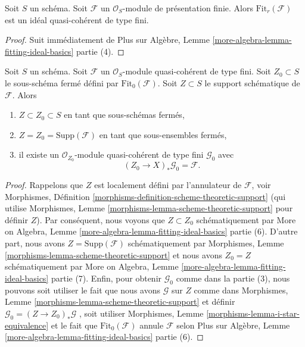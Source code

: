 \begin{lemma}
\label{lemma-fitting-ideal-of-finitely-presented}
Soit  $S$  un schéma. Soit  $\mathcal{F}$  un  $\mathcal{O}_S$-module de
présentation finie. Alors  $\text{Fit}_r(\mathcal{F})$  est un idéal quasi-cohérent de type fini.
\end{lemma}

\begin{proof}
Suit immédiatement de Plus sur Algèbre, Lemme  \ref{more-algebra-lemma-fitting-ideal-basics}  partie (4).
\end{proof}

\begin{lemma}
\label{lemma-on-subscheme-cut-out-by-Fit-0}
Soit  $S$  un schéma. Soit  $\mathcal{F}$  un  $\mathcal{O}_S$-module
quasi-cohérent de type fini. Soit  $Z_0 \subset S$  le sous-schéma fermé défini par
 $\text{Fit}_0(\mathcal{F})$. Soit  $Z \subset S$  le support schématique de  $\mathcal{F}$. Alors
\begin{enumerate}
\item $Z \subset Z_0 \subset S$  en tant que sous-schémas fermés,
\item $Z = Z_0 = \text{Supp}(\mathcal{F})$  en tant que sous-ensembles fermés,
\item il existe un  $\mathcal{O}_{Z_0}$-module quasi-cohérent de type fini  $\mathcal{G}_0$  avec
$$
(Z_0 \to X)_*\mathcal{G}_0 = \mathcal{F}.
$$
\end{enumerate}
\end{lemma}

\begin{proof}
Rappelons que  $Z$  est localement défini par l'annulateur de  $\mathcal{F}$,
voir Morphismes, Définition  \ref{morphisms-definition-scheme-theoretic-support}  (qui utilise Morphismes, Lemme
 \ref{morphisms-lemma-scheme-theoretic-support}  pour définir  $Z$). Par conséquent, nous voyons que
 $Z \subset Z_0$  schématiquement par More on Algebra, Lemme  \ref{more-algebra-lemma-fitting-ideal-basics}  partie (6).
D'autre part, nous avons  $Z = \text{Supp}(\mathcal{F})$  schématiquement par Morphismes, Lemme
 \ref{morphisms-lemma-scheme-theoretic-support}  et nous avons  $Z_0 = Z$  schématiquement par More on Algebra, Lemme
 \ref{more-algebra-lemma-fitting-ideal-basics}  partie (7). Enfin, pour obtenir  $\mathcal{G}_0$  comme dans la partie
(3), nous pouvons soit utiliser le fait que nous avons  $\mathcal{G}$  sur
 $Z$  comme dans Morphismes, Lemme  \ref{morphisms-lemma-scheme-theoretic-support}  et définir  $\mathcal{G}_0 = (Z \to Z_0)_*\mathcal{G}$ ,
soit utiliser Morphismes, Lemme  \ref{morphisms-lemma-i-star-equivalence}  et le fait que  $\text{Fit}_0(\mathcal{F})$  annule
 $\mathcal{F}$  selon Plus sur Algèbre, Lemme  \ref{more-algebra-lemma-fitting-ideal-basics}  partie (6).
\end{proof}

